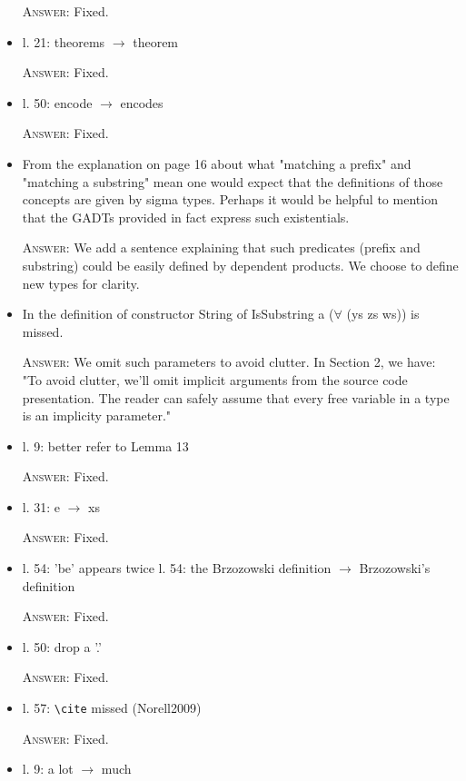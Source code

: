 \documentclass{article}
\begin{document}
\begin{itemize}
    \textsc{Answer}: Fixed.

    \item l. 21: theorems $\to$ theorem

    \textsc{Answer}: Fixed.

    \item l. 50: encode $\to$ encodes

    \textsc{Answer}: Fixed.

    \item From the explanation on page 16 about what "matching a prefix" and "matching a substring" mean one would expect that 
    the definitions of those concepts are given by sigma types. Perhaps it would be helpful to mention that the GADTs 
    provided in fact express such existentials.

    \textsc{Answer}: We add a sentence explaining that such predicates (prefix and substring) could be easily defined by dependent products.
    We choose to define new types for clarity.

    \item In the definition of constructor String of IsSubstring a ($\forall$ (ys zs ws)) is missed.

    \textsc{Answer}: We omit such parameters to avoid clutter. In Section 2, we have:
    "To avoid clutter, we'll omit implicit arguments from the source code presentation. The reader can safely assume that every free variable in a type is an implicity parameter."

    \item l. 9: better refer to Lemma 13

    \textsc{Answer}: Fixed.

    \item l. 31: e $\to$ xs

    \textsc{Answer}: Fixed.


    \item l. 54: 'be' appears twice
          l. 54: the Brzozowski definition $\to$ Brzozowski's definition

    \textsc{Answer}: Fixed.

    \item l. 50: drop a '.'

    \textsc{Answer}: Fixed.

    \item l. 57: \verb|\cite| missed (Norell2009)

    \textsc{Answer}: Fixed.

    \item l. 9: a lot $\to$ much


\end{itemize}
\end{document}

